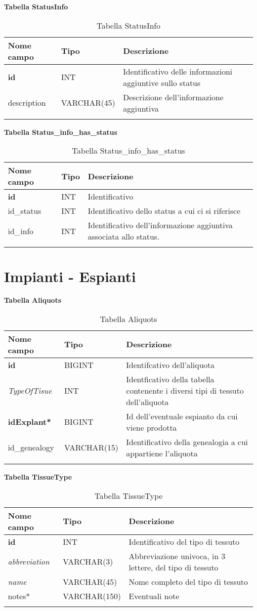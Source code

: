 \textbf{Tabella StatusInfo}

\begin{longtable}{|l|l|p{7.0cm}|}
\hline
\textbf{Nome campo} &	\textbf{Tipo} &	\textbf{Descrizione}\\ \hline
\textbf{id} &	INT &	Identificativo delle informazioni aggiuntive sullo status\\ \hline
description &	VARCHAR(45) &	Descrizione dell'informazione aggiuntiva\\ \hline
\caption{Tabella StatusInfo}
\end{longtable}

\textbf{Tabella Status\_info\_has\_status}

\begin{longtable}{|l|l|p{8.0cm}|}
\hline
\textbf{Nome campo} &	\textbf{Tipo} &	\textbf{Descrizione}\\ \hline
\textbf{id} &	INT &	Identificativo\\ \hline
id\_status &	INT &	Identificativo dello status a cui ci si riferisce\\ \hline
id\_info &	INT &	Identificativo dell'informazione aggiuntiva associata allo status.\\ \hline
\caption{Tabella Status\_info\_has\_status}
\end{longtable}

\section{Impianti - Espianti}

\textbf{Tabella Aliquots}

\begin{longtable}{|l|l|p{5.5cm}|}
\hline
\textbf{Nome campo} &	\textbf{Tipo} &	\textbf{Descrizione}\\ \hline
\textbf{id} &	BIGINT &	Identifcativo dell'aliquota\\ \hline
\textit{TypeOfTisue} &	INT &	Identficativo della tabella contenente i diversi tipi di tessuto dell'aliquota\\ \hline
\textbf{idExplant*} &	BIGINT &	Id dell'eventuale espianto da cui viene prodotta\\ \hline
id\_genealogy & VARCHAR(15) & Identificativo della genealogia a cui appartiene l'aliquota\\ \hline
\caption{Tabella Aliquots}
\end{longtable}

\textbf{Tabella TissueType}

\begin{longtable}{|l|l|p{5.5cm}|}
\hline
\textbf{Nome campo} &	\textbf{Tipo} &	\textbf{Descrizione}\\ \hline
\textbf{id} &	INT &	Identificativo del tipo di tessuto\\ \hline
\textit{abbreviation} &	VARCHAR(3) &	Abbreviazione univoca, in 3 lettere, del tipo di tessuto\\ \hline
\textit{name} &	VARCHAR(45) &	Nome completo del tipo di tessuto\\ \hline
notes* &	VARCHAR(150) &	Eventuali note\\ \hline
\caption{Tabella TissueType}
\end{longtable}

